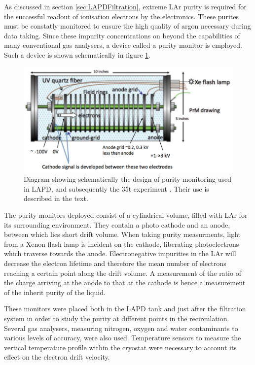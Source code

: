 As discussed in section \ref{sec:LAPDFiltration}, extreme LAr purity is required for the successful readout of ionisation electrons by the electronics.  These purites must be constatly monitored to ensure the high quality of argon necessary during data taking.  Since these impurity concentrations on beyond the capabilities of many conventional gas analysers, a device called a purity monitor is employed.  Such a device is shown schematically in figure \ref{fig:PurityMonitor}.

\begin{figure}[ht]
  \centering
  \includegraphics[width=12cm]{PurityMonitor.png}
  \caption{Diagram showing schematically the design of purity monitoring used in LAPD, and subsequently the 35t experiment \cite{LBNE35tPhaseI}.  Their use is described in the text.}
  \label{fig:PurityMonitor}
\end{figure}

The purity monitors deployed consist of a cylindrical volume, filled with LAr for its surrounding environment.  They contain a photo cathode and an anode, between which lies short drift volume.  When taking purity measurments, light from a Xenon flash lamp is incident on the cathode, liberating photoelectrons which traverse towards the anode.  Electronegative impurities in the LAr will decrease the electron lifetime and therefore the mean number of electrons reaching a certain point along the drift volume.  A measurement of the ratio of the charge arriving at the anode to that at the cathode is hence a measurement of the inherit purity of the liquid.

These monitors were placed both in the LAPD tank and just after the filtration system in order to study the purity at different points in the recirculation.  Several gas analysers, measuring nitrogen, oxygen and water contaminants to various levels of accuracy, were also used.  Temperature sensors to measure the vertical temperature profile within the cryostat were necessary to account its effect on the electron drift velocity.


